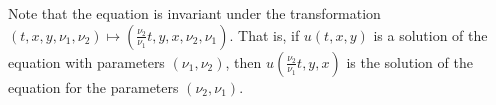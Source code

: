 \documentclass[twoside]{article}
\begin{document}
Note that the equation is invariant under the transformation $(t,x,y, \nu_1, \nu_2) \mapsto \left( \frac{\nu_2}{\nu_1} t, y, x, \nu_2, \nu_1 \right)$. That is, if $u(t,x,y)$ is a solution of the equation with parameters $(\nu_1, \nu_2)$, then $u\left( \frac{\nu_2}{\nu_1} t, y, x \right)$ is the solution of the equation for the parameters $(\nu_2, \nu_1)$.

{}
\printbibliography
\end{document}
